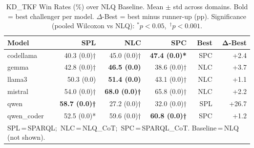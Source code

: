 \begin{table}[t]
\centering
\small
\caption{KD\_TKF Win Rates (\%) over NLQ Baseline. Mean $\pm$ std across domains. Bold = best challenger per model. $\Delta$-Best = best minus runner-up (pp). Significance (pooled Wilcoxon vs NLQ): $^{*}p{<}0.05$,\ $^{\dagger}p{<}0.001$.}
\label{tab:rq1_winrates}
\setlength{\tabcolsep}{5pt}
\begin{tabular}{lrrrrr}
\toprule
\textbf{Model} & \textbf{SPL} & \textbf{NLC} & \textbf{SPC} & \textbf{Best} & $\boldsymbol{\Delta}$\textbf{-Best} \\
\midrule
codellama & 40.3 (0.0)† & 45.0 (0.0)† & \textbf{47.4 (0.0)*} & SPC & +2.4 \\
gemma & 42.8 (0.0)† & \textbf{46.5 (0.0)} & 38.6 (0.0)† & NLC & +3.7 \\
llama3 & 50.3 (0.0) & \textbf{51.4 (0.0)} & 43.1 (0.0)† & NLC & +1.1 \\
mistral & 54.0 (0.0)† & \textbf{68.0 (0.0)†} & 65.8 (0.0)† & NLC & +2.2 \\
qwen & \textbf{58.7 (0.0)†} & 27.2 (0.0)† & 32.0 (0.0)† & SPL & +26.7 \\
qwen_coder & 52.5 (0.0)* & 59.6 (0.0)† & \textbf{60.8 (0.0)†} & SPC & +1.2 \\
\bottomrule
\multicolumn{6}{l}{\footnotesize SPL\,=\,SPARQL;\  NLC\,=\,NLQ\_CoT;\  SPC\,=\,SPARQL\_CoT. Baseline\,=\,NLQ (not shown).} \\
\end{tabular}
\end{table}
